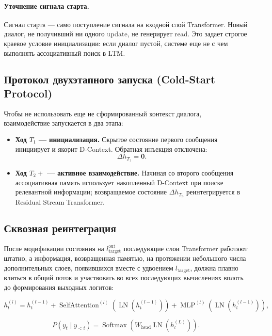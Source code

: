 \documentclass[11pt,a4paper]{article}
\begin{document}
\paragraph{Уточнение сигнала старта.}
Сигнал старта — само поступление сигнала на входной слой Transformer. Новый диалог, не получивший ни одного update, не генерирует read. Это задает строгое краевое условие инициализации: если диалог пустой, системе еще не с чем выполнять ассоциативный поиск в LTM.

\subsection*{Протокол двухэтапного запуска (Cold-Start Protocol)}

Чтобы не использовать еще не сформированный контекст диалога, взаимодействие запускается в два этапа:

\begin{itemize}
    \item \textbf{Ход $T_1$ — инициализация.} Скрытое состояние первого сообщения инициирует и якорит D-Context. Обратная инъекция отключена:
    \[
    \Delta h_{T_1} = \mathbf{0}.
    \]
    \item \textbf{Ход $T_2+$ — активное взаимодействие.} Начиная со второго сообщения ассоциативная память использует накопленный D-Context при поиске релевантной информации; возвращаемое состояние $\Delta h_{T_n}$ реинтегрируется в Residual Stream Transformer.
\end{itemize}

\subsection*{Сквозная реинтеграция}

После модификации состояния на $l_{\text{target}}^{\text{out}}$ последующие слои Transformer работают штатно, а информация, возвращенная памятью, на протяжении небольшого числа дополнительных слоев, появившихся вместе с удвоением $l_{\text{target}}$, должна плавно влиться в общий поток и участвовать во всех последующих вычислениях вплоть до формирования выходных логитов:

\begin{equation}
h_t^{(l)}
=
h_t^{(l-1)}
+
\operatorname{SelfAttention}^{(l)}
\left(\operatorname{LN}(h_t^{(l-1)})\right)
+
\operatorname{MLP}^{(l)}
\left(\operatorname{LN}(h_t^{(l-1)})\right),
\end{equation}

\begin{equation}
P(y_t \mid y_{<t})
=
\operatorname{Softmax}
\left(
W_{\text{head}} \operatorname{LN}(h_t^{(L)})
\right).
\end{equation}
\end{document}
